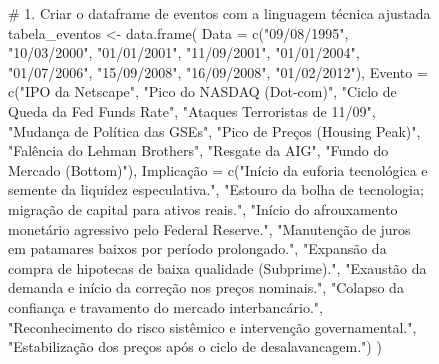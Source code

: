 \documentclass[
  portuguese,
  letterpaper,
  DIV=11,
  numbers=noendperiod,
  oneside]{scrartcl}
\newenvironment{Shaded}{\begin{snugshade}}{\end{snugshade}}
\newcommand{\AttributeTok}[1]{\textcolor[rgb]{0.40,0.45,0.13}{#1}}
\newcommand{\CommentTok}[1]{\textcolor[rgb]{0.37,0.37,0.37}{#1}}
\newcommand{\FunctionTok}[1]{\textcolor[rgb]{0.28,0.35,0.67}{#1}}
\newcommand{\NormalTok}[1]{\textcolor[rgb]{0.00,0.23,0.31}{#1}}
\newcommand{\OtherTok}[1]{\textcolor[rgb]{0.00,0.23,0.31}{#1}}
\newcommand{\StringTok}[1]{\textcolor[rgb]{0.13,0.47,0.30}{#1}}
\begin{document}
\begin{figure}
\begin{Shaded}
\begin{Highlighting}[]
\CommentTok{\# 1. Criar o dataframe de eventos com a linguagem técnica ajustada}
\NormalTok{tabela\_eventos }\OtherTok{\textless{}{-}} \FunctionTok{data.frame}\NormalTok{(}
  \AttributeTok{Data =} \FunctionTok{c}\NormalTok{(}\StringTok{"09/08/1995"}\NormalTok{, }\StringTok{"10/03/2000"}\NormalTok{, }\StringTok{"01/01/2001"}\NormalTok{, }\StringTok{"11/09/2001"}\NormalTok{, }\StringTok{"01/01/2004"}\NormalTok{, }
           \StringTok{"01/07/2006"}\NormalTok{, }\StringTok{"15/09/2008"}\NormalTok{, }\StringTok{"16/09/2008"}\NormalTok{, }\StringTok{"01/02/2012"}\NormalTok{),}
  \AttributeTok{Evento =} \FunctionTok{c}\NormalTok{(}\StringTok{"IPO da Netscape"}\NormalTok{, }\StringTok{"Pico do NASDAQ (Dot{-}com)"}\NormalTok{, }\StringTok{"Ciclo de Queda da Fed Funds Rate"}\NormalTok{, }
             \StringTok{"Ataques Terroristas de 11/09"}\NormalTok{, }\StringTok{"Mudança de Política das GSEs"}\NormalTok{, }
             \StringTok{"Pico de Preços (Housing Peak)"}\NormalTok{, }\StringTok{"Falência do Lehman Brothers"}\NormalTok{, }
             \StringTok{"Resgate da AIG"}\NormalTok{, }\StringTok{"Fundo do Mercado (Bottom)"}\NormalTok{),}
  \StringTok{\textasciigrave{}}\AttributeTok{Implicação}\StringTok{\textasciigrave{}} \OtherTok{=} \FunctionTok{c}\NormalTok{(}\StringTok{"Início da euforia tecnológica e semente da liquidez especulativa."}\NormalTok{,}
                 \StringTok{"Estouro da bolha de tecnologia; migração de capital para ativos reais."}\NormalTok{,}
                 \StringTok{"Início do afrouxamento monetário agressivo pelo Federal Reserve."}\NormalTok{,}
                 \StringTok{"Manutenção de juros em patamares baixos por período prolongado."}\NormalTok{,}
                 \StringTok{"Expansão da compra de hipotecas de baixa qualidade (Subprime)."}\NormalTok{,}
                 \StringTok{"Exaustão da demanda e início da correção nos preços nominais."}\NormalTok{,}
                 \StringTok{"Colapso da confiança e travamento do mercado interbancário."}\NormalTok{,}
                 \StringTok{"Reconhecimento do risco sistêmico e intervenção governamental."}\NormalTok{,}
                 \StringTok{"Estabilização dos preços após o ciclo de desalavancagem."}\NormalTok{)}
\NormalTok{)}


\end{Highlighting}
\end{Shaded}
\end{figure}
\end{document}
